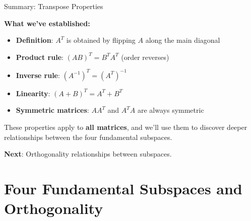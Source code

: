 \documentclass[10pt]{beamer}
\theoremstyle{definition}
\newcommand{\x}[1]{\alert{\textbf{#1}}}
\begin{document}
\begin{frame}{Summary: Transpose Properties}

\textbf{What we've established:}

\begin{itemize}
\item \x{Definition}: $A^T$ is obtained by flipping $A$ along the main diagonal
\item \x{Product rule}: $(AB)^T = B^T A^T$ (order reverses)
\item \x{Inverse rule}: $(A^{-1})^T = (A^T)^{-1}$
\item \x{Linearity}: $(A + B)^T = A^T + B^T$
\item \x{Symmetric matrices}: $AA^T$ and $A^T A$ are always symmetric
\end{itemize}

\vspace{1em}

These properties apply to \x{all matrices}, and we'll use them to discover deeper relationships between the four fundamental subspaces.

\vspace{1em}

\x{Next}: Orthogonality relationships between subspaces.

\end{frame}

\section{Four Fundamental Subspaces and Orthogonality}
\end{document}

